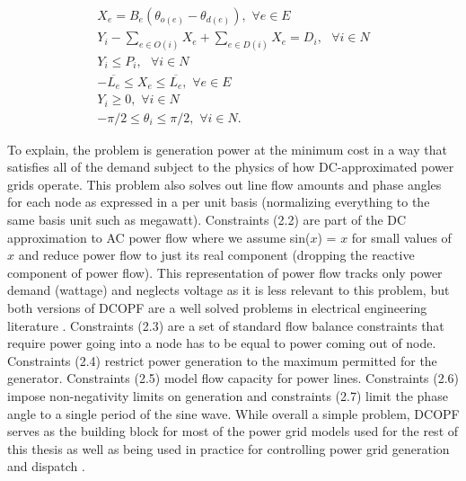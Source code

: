 \begin{eqnarray}
X_e = B_e (\theta_{o(e)} - \theta_{d(e)}), \hspace{4pt} \forall e \in E\\
Y_i - \sum_{e \in O(i)} X_e + \sum_{e \in D(i)} X_e = D_i, \hspace{4pt} \hspace{4pt} \forall i \in N\\
Y_i \leq P_{i}, \hspace{4pt} \hspace{4pt} \forall i \in N	\\ 
-\overline{L_e} \leq X_e \leq \overline{L_e}, \hspace{4pt} \forall e \in E\\
Y_i \geq 0, \hspace{4pt} \forall i \in N\\
-\pi/2 \leq \theta_i \leq \pi/2, \hspace{4pt} \forall i \in N.
\end{eqnarray}

To explain, the problem is generation power at the minimum cost in a way that satisfies all of the demand subject to the physics of how DC-approximated power grids operate. This problem also solves out line flow amounts and phase angles for each node as expressed in a per unit basis (normalizing everything to the same basis unit such as megawatt). Constraints (2.2) are part of the DC approximation to AC power flow where we assume sin($x$) = $x$ for small values of $x$ and reduce power flow to just its real component (dropping the reactive component of power flow). This representation of power flow tracks only power demand (wattage) and neglects voltage as it is less relevant to this problem, but both versions of DCOPF are a well solved problems in electrical engineering literature \cite{Frank2016} \cite{EldridgeEA2017} \cite{ZhangChow2015}. Constraints (2.3) are a set of standard flow balance constraints that require power going into a node has to be equal to power coming out of node. Constraints (2.4) restrict power generation to the maximum permitted for the generator. Constraints (2.5) model flow capacity for power lines. Constraints (2.6) impose non-negativity limits on generation and constraints (2.7) limit the phase angle to a single period of the sine wave. While overall a simple problem, DCOPF serves as the building block for most of the power grid models used for the rest of this thesis as well as being used in practice for controlling power grid generation and dispatch \cite{LiBo2007}. 
